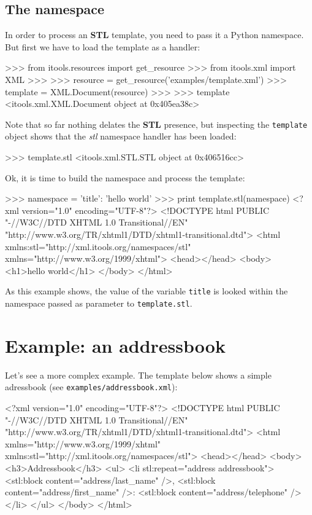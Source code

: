 \subsection{The namespace}

In order to process an {\bf STL} template, you need to pass it a Python
namespace. But first we have to load the template as a handler:

\begin{code}
    >>> from itools.resources import get_resource
    >>> from itools.xml import XML
    >>>   
    >>> resource = get_resource('examples/template.xml')
    >>> template = XML.Document(resource)
    >>> 
    >>> template
    <itools.xml.XML.Document object at 0x405ea38c>
\end{code}

Note that so far nothing delates the {\bf STL} presence, but inspecting
the {\tt template} object shows that the {\em stl} namespace handler has
been loaded:

\begin{code}
    >>> template.stl
    <itools.xml.STL.STL object at 0x406516cc>
\end{code}

Ok, it is time to build the namespace and process the template:

\begin{code}
    >>> namespace = {'title': 'hello world'}
    >>> print template.stl(namespace)
    <?xml version="1.0" encoding="UTF-8"?>
    <!DOCTYPE html
         PUBLIC "-//W3C//DTD XHTML 1.0 Transitional//EN"
        "http://www.w3.org/TR/xhtml1/DTD/xhtml1-transitional.dtd">
    <html xmlns:stl="http://xml.itools.org/namespaces/stl"
          xmlns="http://www.w3.org/1999/xhtml">
      <head></head>
      <body>
        <h1>hello world</h1>
      </body>
    </html>
\end{code}


As this example shows, the value of the variable {\tt title} is looked within
the namespace passed as parameter to {\tt template.stl}.


\section{Example: an addressbook}

Let's see a more complex example. The template below shows a simple
adressbook (see {\tt examples/addressbook.xml}):

\begin{code}
    <?xml version="1.0" encoding="UTF-8"?>
    <!DOCTYPE html
         PUBLIC "-//W3C//DTD XHTML 1.0 Transitional//EN"
         "http://www.w3.org/TR/xhtml1/DTD/xhtml1-transitional.dtd">
    <html xmlns="http://www.w3.org/1999/xhtml"
          xmlns:stl="http://xml.itools.org/namespaces/stl">
      <head></head>
      <body>
        <h3>Addressbook</h3>
        <ul>
          <li stl:repeat="address addressbook">
            <stl:block content="address/last_name" />,
            <stl:block content="address/first_name" />:
            <stl:block content="address/telephone" />
          </li>
        </ul>
      </body>
    </html>
\end{code}

